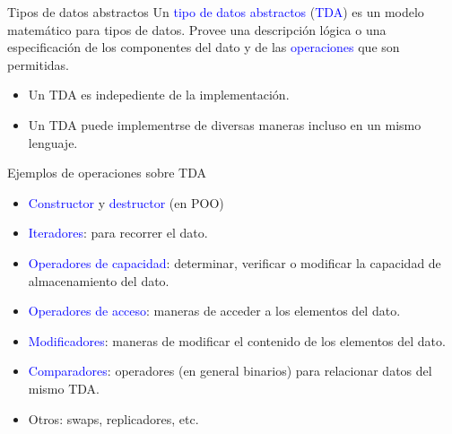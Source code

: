 \documentclass{beamer} %
\newcommand{\blue}[1]{\textcolor{blue}{#1}}
\begin{document}
\begin{frame}{Tipos de datos abstractos}
    Un \blue{tipo de datos abstractos} (\blue{TDA}) es un modelo matemático para tipos de datos. Provee una descripción lógica o una especificación de los componentes del dato y de las \blue{operaciones} que son permitidas.
    \begin{itemize}
      \item<2-> Un TDA es indepediente de la implementación.
      \item<3-> Un TDA puede implementrse de diversas maneras incluso en un mismo lenguaje.
    \end{itemize}
\end{frame}


\begin{frame}{Ejemplos de operaciones sobre TDA}
    \begin{itemize}
      \item<1-> \blue{Constructor} y \blue{destructor} (en POO)
      \item<2-> \blue{Iteradores}: para recorrer el dato.
      \item<3-> \blue{Operadores de capacidad}: determinar, verificar o modificar la capacidad de almacenamiento del dato.
      \item<4-> \blue{Operadores de acceso}: maneras de acceder a los elementos del dato.
      \item<5-> \blue{Modificadores}: maneras de modificar el contenido de los elementos del dato.
      \item<6-> \blue{Comparadores}: operadores (en general binarios) para relacionar datos del mismo TDA.
      \item<7-> Otros: swaps, replicadores, etc.
    \end{itemize}
\end{frame}
\end{document}
